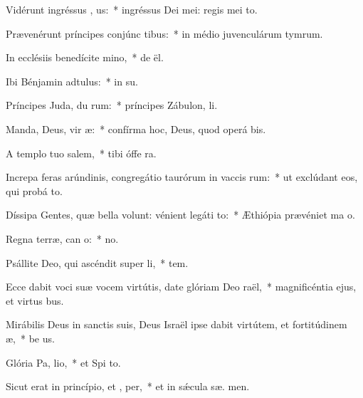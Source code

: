 \item Vidérunt ingréssus , us:~* ingréssus Dei mei: regis mei    to.
\item Prævenérunt príncipes conjúnc tibus:~* in médio juvenculárum tymrum.
\item In ecclésiis benedícite  mino,~* de  ël.
\item Ibi Bénjamin adtulus:~* in  su.
\item Príncipes Juda, du rum:~* príncipes Zábulon,  li.
\item Manda, Deus, vir æ:~* confírma hoc, Deus, quod operá   bis.
\item A templo tuo  salem,~* tibi óffe  ra.
\item Increpa feras arúndinis, congregátio taurórum in vaccis rum:~* ut exclúdant eos, qui probá  to.
\item Díssipa Gentes, quæ bella volunt: vénient legáti  to:~* Æthiópia prævéniet ma  o.
\item Regna terræ, can o:~*  no.
\item Psállite Deo, qui ascéndit super  li,~*  tem.
\item Ecce dabit voci suæ vocem virtútis, date glóriam Deo  raël,~* magnificéntia ejus, et virtus   bus.
\item Mirábilis Deus in sanctis suis, Deus Israël ipse dabit virtútem, et fortitúdinem  æ,~* be us.
\item Glória Pa,  lio,~* et Spi to.
\item Sicut erat in princípio, et ,  per,~* et in sǽcula sæ. men.
